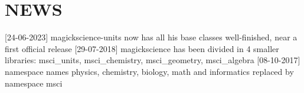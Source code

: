 \chapter{NEWS}
\hypertarget{md_NEWS}{}\label{md_NEWS}
\mbox{[}24-\/06-\/2023\mbox{]} magickscience-\/units now has all his base classes well-\/finished, near a first official release \mbox{[}29-\/07-\/2018\mbox{]} magickscience has been divided in 4 smaller libraries\+: msci\+\_\+units, msci\+\_\+chemistry, msci\+\_\+geometry, msci\+\_\+algebra \mbox{[}08-\/10-\/2017\mbox{]} namespace names physics, chemistry, biology, math and informatics replaced by namespace msci 
